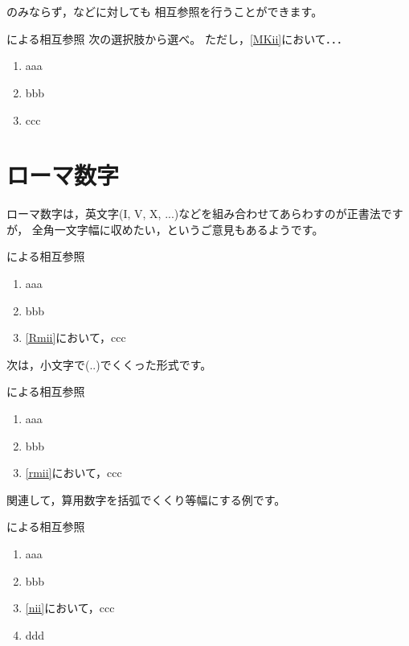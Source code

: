 \documentclass[a4j]{jarticle}
\begin{document}
\section{}
のみならず，などに対しても
相互参照を行うことができます。

\begin{showEx}{による相互参照}
\let\maru\ajMaruKaku
次の選択肢から選べ。
ただし，\ref{MKii}において．．．
\begin{enumerate}[m]
  \item aaa
  \item \label{MKii}bbb
  \item ccc
\end{enumerate}
\end{showEx}
\newpage

\section{ローマ数字}
ローマ数字は，英文字(I, V, X, ...)などを組み合わせてあらわすのが正書法ですが，
全角一文字幅に収めたい，というご意見もあるようです。

\begin{showEx}{による相互参照}
\let\maru\ajRoman
\begin{enumerate}[m]
  \item aaa
  \item \label{Rmii}bbb
  \item \ref{Rmii}において，ccc
\end{enumerate}
\end{showEx}

次は，小文字で(..)でくくった形式です。

\begin{showEx}{による相互参照}
\let\maru\ajKakkoroman
\begin{enumerate}[m]
  \item aaa
  \item \label{rmii}bbb
  \item \ref{rmii}において，ccc
\end{enumerate}
\end{showEx}
\newpage

関連して，算用数字を括弧でくくり等幅にする例です。

\begin{showEx}{による相互参照}
\let\maru\ajKakko
\begin{enumerate}<syokiti=7>[m]
  \item aaa
  \item \label{nii}bbb
  \item \ref{nii}において，ccc
  \item ddd
\end{enumerate}
\end{showEx}
\end{document}

